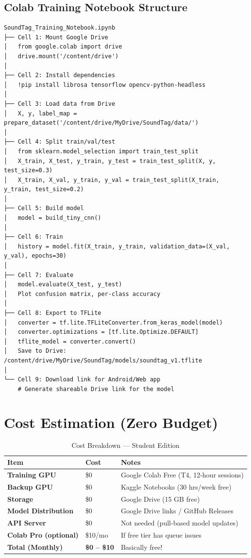 \documentclass[11pt,a4paper]{article}
\begin{document}
\subsection{Colab Training Notebook Structure}

\begin{verbatim}
SoundTag_Training_Notebook.ipynb
├── Cell 1: Mount Google Drive
│   from google.colab import drive
│   drive.mount('/content/drive')
│
├── Cell 2: Install dependencies
│   !pip install librosa tensorflow opencv-python-headless
│
├── Cell 3: Load data from Drive
│   X, y, label_map = prepare_dataset('/content/drive/MyDrive/SoundTag/data/')
│
├── Cell 4: Split train/val/test
│   from sklearn.model_selection import train_test_split
│   X_train, X_test, y_train, y_test = train_test_split(X, y, test_size=0.3)
│   X_train, X_val, y_train, y_val = train_test_split(X_train, y_train, test_size=0.2)
│
├── Cell 5: Build model
│   model = build_tiny_cnn()
│
├── Cell 6: Train
│   history = model.fit(X_train, y_train, validation_data=(X_val, y_val), epochs=30)
│
├── Cell 7: Evaluate
│   model.evaluate(X_test, y_test)
│   Plot confusion matrix, per-class accuracy
│
├── Cell 8: Export to TFLite
│   converter = tf.lite.TFLiteConverter.from_keras_model(model)
│   converter.optimizations = [tf.lite.Optimize.DEFAULT]
│   tflite_model = converter.convert()
│   Save to Drive: /content/drive/MyDrive/SoundTag/models/soundtag_v1.tflite
│
└── Cell 9: Download link for Android/Web app
    # Generate shareable Drive link for the model
\end{verbatim}

\section{Cost Estimation (Zero Budget)}

\begin{table}[h]
\centering
\caption{Cost Breakdown — Student Edition}
\begin{tabular}{@{}p{5cm}p{3cm}p{4cm}@{}}
\toprule
\textbf{Item} & \textbf{Cost} & \textbf{Notes} \\
\midrule
\textbf{Training GPU} & \$0 & Google Colab Free (T4, 12-hour sessions) \\
\textbf{Backup GPU} & \$0 & Kaggle Notebooks (30 hrs/week free) \\
\textbf{Storage} & \$0 & Google Drive (15 GB free) \\
\textbf{Model Distribution} & \$0 & Google Drive links / GitHub Releases \\
\textbf{API Server} & \$0 & Not needed (pull-based model updates) \\
\textbf{Colab Pro (optional)} & \$10/mo & If free tier has queue issues \\
\midrule
\textbf{Total (Monthly)} & \textbf{\$0 -- \$10} & Basically free! \\
\bottomrule
\end{tabular}
\end{table}
\end{document}
